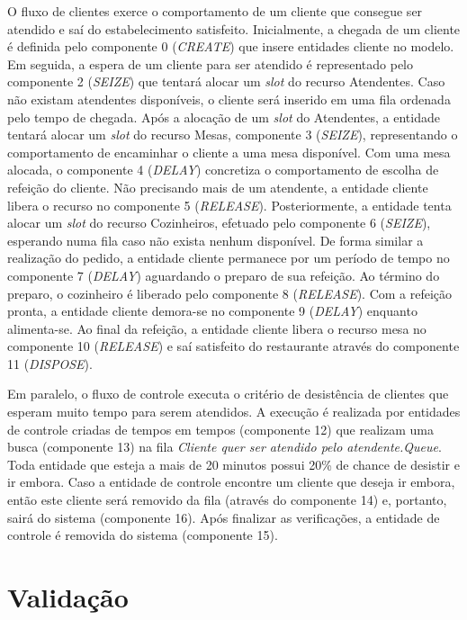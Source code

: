 \documentclass[pt,disc,oneside]{ufscpgeasthesis}
\begin{document}
			O fluxo de clientes exerce o comportamento de um cliente que consegue ser atendido e saí do estabelecimento satisfeito.
			Inicialmente, a chegada de um cliente é definida pelo componente 0 (\textit{CREATE}) que insere entidades cliente no modelo.
			Em seguida, a espera de um cliente para ser atendido é representado pelo componente 2 (\textit{SEIZE}) que tentará alocar um \textit{slot} do recurso Atendentes.
			Caso não existam atendentes disponíveis, o cliente será inserido em uma fila ordenada pelo tempo de chegada.
			Após a alocação de um \textit{slot} do Atendentes, a entidade tentará alocar um \textit{slot} do recurso Mesas, componente 3 (\textit{SEIZE}), representando o comportamento de encaminhar o cliente a uma mesa disponível.
			Com uma mesa alocada, o componente 4 (\textit{DELAY}) concretiza o comportamento de escolha de refeição do cliente.
			Não precisando mais de um atendente, a entidade cliente libera o recurso no componente 5 (\textit{RELEASE}).
			Posteriormente, a entidade tenta alocar um \textit{slot} do recurso Cozinheiros, efetuado pelo componente 6 (\textit{SEIZE}), esperando numa fila caso não exista nenhum disponível.
			De forma similar a realização do pedido, a entidade cliente permanece por um período de tempo no componente 7 (\textit{DELAY}) aguardando o preparo de sua refeição.
			Ao término do preparo, o cozinheiro é liberado pelo componente 8 (\textit{RELEASE}).
			Com a refeição pronta, a entidade cliente demora-se no componente 9 (\textit{DELAY}) enquanto alimenta-se.
			Ao final da refeição, a entidade cliente libera o recurso mesa no componente 10 (\textit{RELEASE}) e saí satisfeito do restaurante através do componente 11 (\textit{DISPOSE}).

			Em paralelo, o fluxo de controle executa o critério de desistência de clientes que esperam muito tempo para serem atendidos.
			A execução é realizada por entidades de controle criadas de tempos em tempos (componente 12) que realizam uma busca (componente 13) na fila \textit{Cliente quer ser atendido pelo atendente.Queue}.
			Toda entidade que esteja a mais de 20 minutos possui 20\% de chance de desistir e ir embora.
			Caso a entidade de controle encontre um cliente que deseja ir embora, então este cliente será removido da fila (através do componente 14) e, portanto, sairá do sistema (componente 16).
			Após finalizar as verificações, a entidade de controle é removida do sistema (componente 15).

		\section{Validação}
		\label{sec:validacao}
\end{document}

